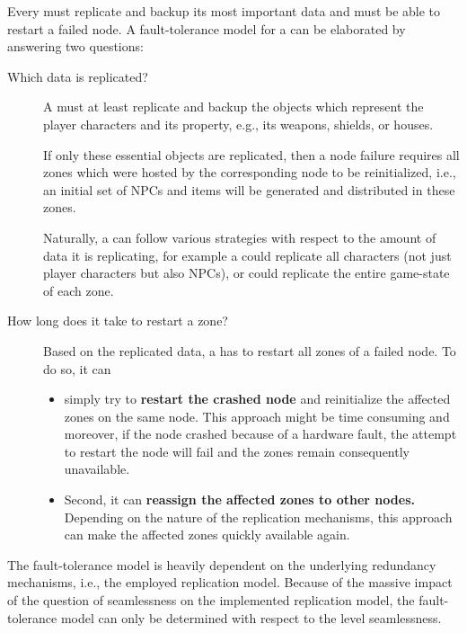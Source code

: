 \documentclass[a4paper, 10pt]{book}
\begin{document}
            Every \MMORG must replicate and backup its most important data and
            must be able to restart a failed node. A fault-tolerance model for a
            \MMORG can be elaborated by answering two questions:
            \begin{description}
                \item[Which data is replicated?] A \MMORG must at least replicate and
                    backup the objects which represent the player characters and its
                    property, e.g., its weapons, shields, or houses.

                    If only these essential objects are replicated, then a node failure
                    requires all zones which were hosted by the corresponding node to be
                    reinitialized, i.e., an initial set of NPCs and items will be
                    generated and distributed in these zones. 

                    Naturally, a \MMORG can follow various strategies with respect to
                    the amount of data it is replicating, for example a \MMORG could
                    replicate all characters (not just player characters but also NPCs),
                    or could replicate the entire game-state of each zone.
                \item[How long does it take to restart a zone?] Based on the
                    replicated data, a \MMORG has to restart all zones of a failed
                    node. To do so, it can 
                    \begin{itemize}
                        \item simply try to \textbf{restart the crashed node} and
                            reinitialize the affected zones on the same node.  This approach
                            might be time consuming and moreover, if the node crashed because
                            of a hardware fault, the attempt to restart the node will fail and
                            the zones remain consequently unavailable.
                        \item Second, it can \textbf{reassign the affected zones to other
                            nodes.} Depending on the nature of the replication mechanisms,
                            this approach can make the affected zones quickly available
                            again.
                    \end{itemize}
            \end{description}
            The fault-tolerance model is heavily dependent on the underlying
            redundancy mechanisms, i.e., the employed replication model. Because
            of the massive impact of the question of seamlessness on the
            implemented replication model, the fault-tolerance model can only be
            determined with respect to the level seamlessness.
\end{document}
